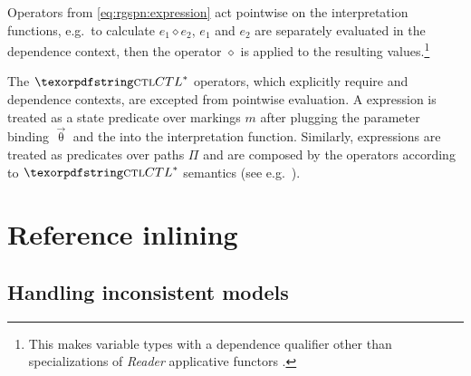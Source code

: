 Operators from \vref{eq:rgspn:expression} act pointwise on the interpretation functions, e.g.~to calculate \(e_1 \mathbin{\diamond} e_2\), \(e_1\) and \(e_2\) are separately evaluated in the dependence context, then the operator \(\diamond\) is applied to the resulting values.\footnote{This makes variable types with a dependence qualifier other than  specializations of \emph{Reader} applicative functors .}

The \(\textabbr{CTL}^*\) operators, which explicitly require  and  dependence contexts, are excepted from pointwise evaluation. A  expression is treated as a state predicate over markings \(m\) after plugging the parameter binding \(\vec{\uptheta}\) and the  into the interpretation function. Similarly,  expressions are treated as predicates over paths \(\Pi\) and are composed by the operators according to \(\textabbr{CTL}^*\) semantics (see e.g.~).


\section{Reference inlining}
\label{sec:rgspn:inlining}

\subsection{Handling inconsistent models}
\label{ssec:rgspn:inconsistent}


